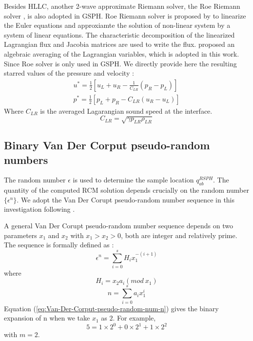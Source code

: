Besides HLLC, another 2-wave approximate Riemann solver, the Roe Riemann solver \citep{roe1981approximate}, is also adopted in GSPH.
Roe Riemann solver is proposed by \citet{roe1981approximate} to linearize the Euler equations and approxiamte the solution of non-linear system by a system of linear equations. The characteristic decomposition of the linearized Lagrangian flux and Jacobia matrices are used to write the flux. \citet{rider1994review} proposed an algebraic averaging of the Lagrangian variables, which is adopted in this work. Since Roe solver is only used in GSPH. We directly provide here the resulting starred values of the pressure and velocity \citep{puri2014approximate}: 
\begin{eqnarray}
u^{\ast} = \frac{1}{2} \left[ u_L + u_R - \frac{1}{C_{LR}} (p_R - p_L) \right] \label{eq:RP-solver-ROE-u} \\
p^{\ast} = \frac{1}{2}\left[ p_L + p_R - C_{LR} (u_R - u_L) \right] \label{eq:RP-solver-ROE-p}
\end{eqnarray}
Where $C_{LR}$ is the averaged Lagarangian sound speed at the interface.
\begin{equation}
C_{LR} = \sqrt{\gamma p_{LR} \rho_{LR}}
\end{equation}

\subsection{Binary Van Der Corput pseudo-random numbers} \label{sec:Van-Der-Corput-random-num}
The random number $\epsilon$ is used to determine the sample location $q_{ab}^{RSPH}$. The quantity of the computed RCM solution depends crucially on the random number $\{\epsilon ^n\}$. We adopt the Van Der Corupt pseudo-random number sequence \citep{hammersley2013monte} in this investigation following \citet{colella1982glimm}.

A general Van Der Corupt pseudo-random number sequence depends on two parameters $x_1$ and $x_2$ with $x_1 > x_2 > 0$, both are integer and relatively prime. The sequence is formally defined as \citep{hammersley2013monte}:
\begin{equation}
\epsilon ^n = \sum_{i=0}^{s} H_i x_1^{-(i+1)}
\label{eq:Van-Der-Corput-pseudo-random-num}
\end{equation}
where
\begin{equation}
H_i = x_2 a_i(mod \ x_1)
\label{eq:Van-Der-Corput-pseudo-random-num-Hi}
\end{equation} 
\begin{equation}
n = \sum_{i=0}^{s} a_i x_1^i
\label{eq:Van-Der-Corput-pseudo-random-num-n}
\end{equation} 
Equation (\ref{eq:Van-Der-Corput-pseudo-random-num-n}) gives the binary expansion of n when we take $x_1$ as $2$. For example,
\begin{equation}
5=1 \times 2^0 + 0 \times 2^1 + 1 \times 2^2
\end{equation}
with $m=2$. 

